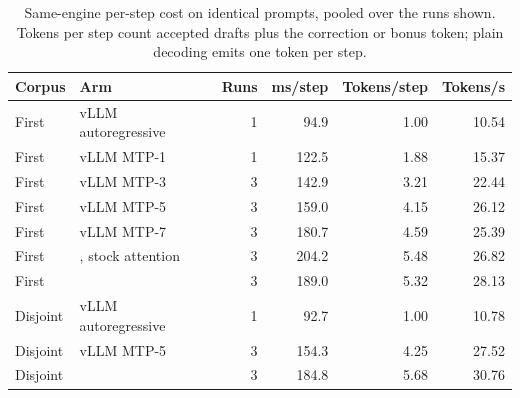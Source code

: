 \begin{table}[t]
\caption{Same-engine per-step cost on identical prompts, pooled over the runs shown. Tokens per step count accepted drafts plus the correction or bonus token; plain decoding emits one token per step.}
\label{tab:per-step}
\centering\small
\setlength{\tabcolsep}{3.5pt}
\begin{tabular}{@{}llrrrr@{}}
\toprule
Corpus & Arm & Runs & ms/step & Tokens/step & Tokens/s \\
\midrule
First & vLLM autoregressive & 1 & 94.9 & 1.00 & 10.54 \\
First & vLLM MTP-1 & 1 & 122.5 & 1.88 & 15.37 \\
First & vLLM MTP-3 & 3 & 142.9 & 3.21 & 22.44 \\
First & vLLM MTP-5 & 3 & 159.0 & 4.15 & 26.12 \\
First & vLLM MTP-7 & 3 & 180.7 & 4.59 & 25.39 \\
First & \sys{}, stock attention & 3 & 204.2 & 5.48 & 26.82 \\
First & \sys{} & 3 & 189.0 & 5.32 & 28.13 \\
Disjoint & vLLM autoregressive & 1 & 92.7 & 1.00 & 10.78 \\
Disjoint & vLLM MTP-5 & 3 & 154.3 & 4.25 & 27.52 \\
Disjoint & \sys{} & 3 & 184.8 & 5.68 & 30.76 \\
\bottomrule
\end{tabular}
\end{table}
